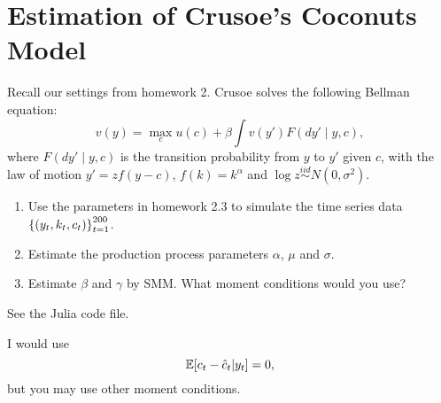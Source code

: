 \documentclass[12pt]{article}
\begin{document}
\section{Estimation of Crusoe's Coconuts Model}
Recall our settings from homework 2. Crusoe solves the following Bellman equation: 
\begin{equation*}
    v(y) = \max_{c} u(c) + \beta \int v(y') F(dy'\mid y, c),
\end{equation*}
where $F(dy'\mid y, c)$ is the transition probability from $y$ to $y'$ given $c$, 
with the law of motion $y' = zf(y - c)$, $f(k) = k^\alpha$ and $\log z\overset{iid}{\sim} N(0, \sigma^2)$.
\begin{enumerate}
    \item Use the parameters in homework 2.3 to simulate the time series data 
    $\left\{ {(y_t, k_t, c_t)} \right\}_{t=1}^{200}$. 
    \item Estimate the production process parameters $\alpha$, $\mu$ and $\sigma$.  
    \item Estimate $\beta$ and $\gamma$ by SMM. What 
    moment conditions would you use? 
\end{enumerate}
\begin{sol}[1.1, 1.2]
    See the Julia code file.
\end{sol} 

\begin{sol}[1.3]
    I would use 
    \begin{equation*}
        \Ex{c_t - \hat{c}_t|y_t} = 0,
    \end{equation*}
    but you may use other moment conditions.
\end{sol}
\end{document}
